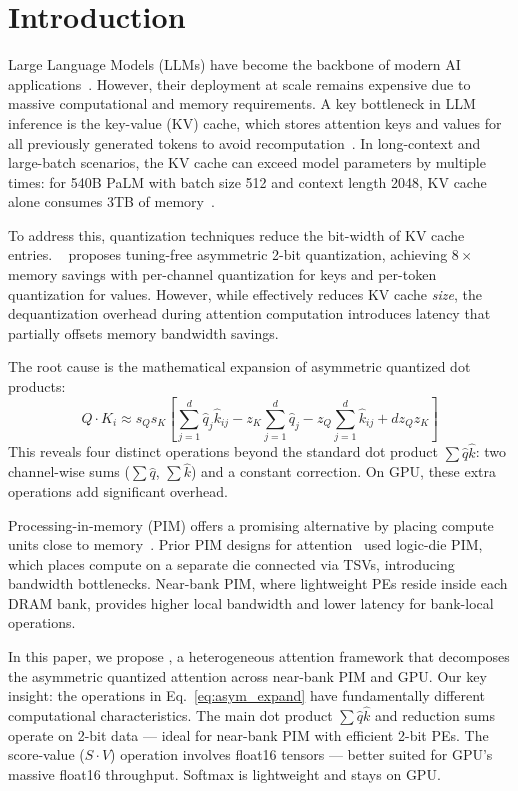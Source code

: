 \section{Introduction}

Large Language Models (LLMs) have become the backbone of modern AI applications~\cite{brown2020language}.
However, their deployment at scale remains expensive due to massive computational and memory requirements.
A key bottleneck in LLM inference is the key-value (KV) cache, which stores attention keys and values for all previously generated tokens to avoid recomputation~\cite{pope2023efficiently}.
In long-context and large-batch scenarios, the KV cache can exceed model parameters by multiple times: for 540B PaLM with batch size 512 and context length 2048, KV cache alone consumes 3TB of memory~\cite{pope2023efficiently}.

To address this, quantization techniques reduce the bit-width of KV cache entries.
\kivi{}~\cite{kivi} proposes tuning-free asymmetric 2-bit quantization, achieving $8\times$ memory savings with per-channel quantization for keys and per-token quantization for values.
However, while \kivi{} effectively reduces KV cache \emph{size}, the dequantization overhead during attention computation introduces latency that partially offsets memory bandwidth savings.

The root cause is the mathematical expansion of asymmetric quantized dot products:
\begin{equation}
Q \cdot K_i \approx s_Q s_K \left[\sum_{j=1}^{d} \hat{q}_j \hat{k}_{ij} - z_K\sum_{j=1}^{d} \hat{q}_j - z_Q\sum_{j=1}^{d} \hat{k}_{ij} + d z_Q z_K\right]
\label{eq:asym_expand}
\end{equation}
This reveals four distinct operations beyond the standard dot product $\sum \hat{q}\hat{k}$: two channel-wise sums ($\sum\hat{q}$, $\sum\hat{k}$) and a constant correction.
On GPU, these extra operations add significant overhead.

Processing-in-memory (PIM) offers a promising alternative by placing compute units close to memory~\cite{mutlu2020processing,seshadri2017ambit}.
Prior PIM designs for attention~\cite{duplex} used logic-die PIM, which places compute on a separate die connected via TSVs, introducing bandwidth bottlenecks.
Near-bank PIM, where lightweight PEs reside inside each DRAM bank, provides higher local bandwidth and lower latency for bank-local operations.

In this paper, we propose \pimattn{}, a heterogeneous attention framework that decomposes the asymmetric quantized attention across near-bank PIM and GPU.
Our key insight: the operations in Eq.~\ref{eq:asym_expand} have fundamentally different computational characteristics.
The main dot product $\sum\hat{q}\hat{k}$ and reduction sums operate on 2-bit data --- ideal for near-bank PIM with efficient 2-bit PEs.
The score-value ($S\cdot V$) operation involves float16 tensors --- better suited for GPU's massive float16 throughput.
Softmax is lightweight and stays on GPU.

